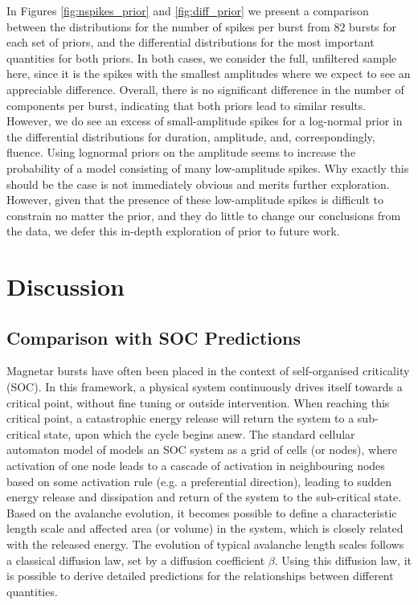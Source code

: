 \documentclass[12pt]{emulateapj}
\begin{document}
In Figures \ref{fig:nspikes_prior} and \ref{fig:diff_prior} we present a comparison between the distributions for the number of spikes 
per burst from $82$ bursts for each set of priors, and the differential distributions for the most important quantities for both priors.
In both cases, we consider the full, unfiltered sample here, since it is the spikes with the smallest amplitudes where we expect to see
an appreciable difference. Overall, there is no significant difference in the number of components per burst, indicating that both 
priors lead to similar results. However, we do see an excess of small-amplitude spikes for a log-normal prior in the differential 
distributions for duration, amplitude, and, correspondingly, fluence. Using lognormal priors on the amplitude seems to increase
the probability of a model consisting of many low-amplitude spikes. Why exactly this should be the case is not immediately 
obvious and merits further exploration. However, given that the presence of these low-amplitude spikes is difficult to constrain no matter
the prior, and they do little to change our conclusions from the data, we defer this in-depth exploration of prior to future work.


\section{Discussion}
\label{sec:discussion}

\subsection{Comparison with SOC Predictions}
\label{sec:soc}

Magnetar bursts have often been placed in the context of self-organised criticality (SOC). In this framework, a physical system continuously drives
itself towards a critical point, without fine tuning or outside intervention. When reaching this critical point, a catastrophic energy
release will return the system to a sub-critical state, upon which the cycle begins anew. The standard cellular automaton model of \citet{bak1987} models an SOC system as a grid of cells (or nodes), where activation of one node leads to a cascade of activation in neighbouring nodes based on some activation rule (e.g. a preferential direction), leading to 
sudden energy release and dissipation and return of the system to the sub-critical state.
Based on the avalanche evolution, it becomes possible to define a characteristic length scale and affected 
area (or volume) in the system, which is closely related with the released energy. 
The evolution of typical avalanche length scales follows a classical diffusion law, set by a diffusion coefficient $\beta$. 
 Using this diffusion law, it is possible to derive detailed predictions for the relationships between different quantities.
\end{document}
